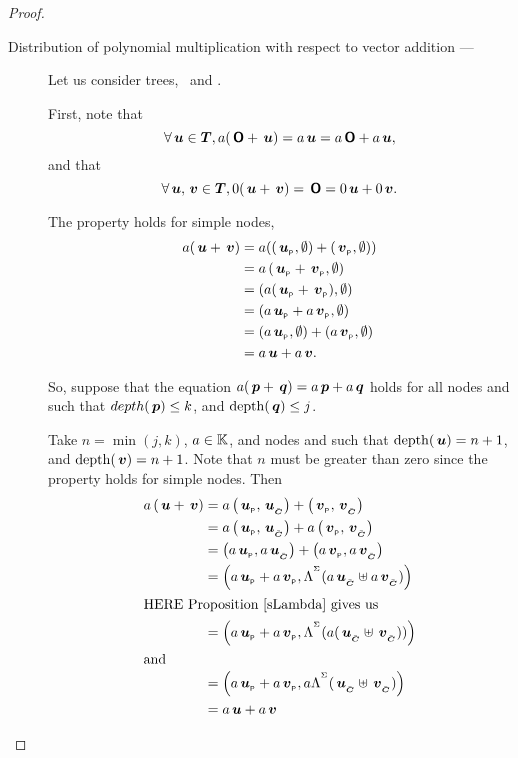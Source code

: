 \begin{proposition}
\begin{proof}
\begin{description}
    \item[Distribution of polynomial multiplication with respect to vector addition --- ]

      Let us consider trees, \ and .

      First, note that \[\forall \node{u} \in \DOM, a(\zerotree + \node{u}) = a \node{u} = a\zerotree + a \node{u},\]
      and that \[\forall \node{u},\node{v}\in\DOM, 0 (\node{u} + \node{v}) = \zerotree = 0 \node{u} + 0 \node{v}.\]

      The property holds for simple nodes, 
      \begin{align*}
        a(\node{u} + \node{v}) &= a (\NodeR{\nlabel{u}}{\emptyset} + \NodeR{\nlabel{v}}{\emptyset})\\ 
        &= a \NodeR{\nlabel{u} + \nlabel{v}}{\emptyset} \\
        &= \NodeR{a(\nlabel{u} + \nlabel{v})}{\emptyset} \\
        &= \NodeR{a\nlabel{u} + a\nlabel{v}}{\emptyset} \\
        &= \NodeR{a\nlabel{u}}{\emptyset} + \NodeR{a\nlabel{v}}{\emptyset} \\
        &= a \node{u} + a \node{v}.
      \end{align*}

      So, suppose that the equation $a ( \node{p} + \node{q}) =
      a \node{p} + a \node{q}$ holds for all nodes  and
       such that $depth(\node{p}) \leq k$, and
      $\depth(\node{q}) \leq j$.

      Take $n = \min(j, k)$, $a\in\FIELD$, and nodes  and  such that
      $\depth(\node{u}) = n+1$, and $\depth(\node{v}) = n+1$.
      Note that $n$ must be greater than zero since the property holds for simple
      nodes.  Then
      \begin{align*}
        a \left(\node{u} + \node{v}\right) &= a \NodeR{\nlabel{u}}{\child{u}} + \NodeR{\nlabel{v}}{\child{v}}\\
        &= a\NodeR{\nlabel{u}}{\child{u}} + a\NodeR{\nlabel{v}}{\child{v}}\\        
        &= \NodeR{a \nlabel{u}}{a \child{u}} + \NodeR{a \nlabel{v}}{a \child{v}}\\
        &= \NodeR{a \nlabel{u} + a \nlabel{v}}{\LS(a \child{u} \mscup a \child{v})}\\
        \intertext{HERE Proposition \ref{sLambda} gives us}
        &= \NodeR{a \nlabel{u} + a \nlabel{v}}{\LS(a(\child{u} \mscup \child{v}))}\\
        \intertext{and }
        &= \NodeR{a \nlabel{u} + a \nlabel{v}}{a \LS(\child{u} \mscup \child{v})}\\
        &= a\node{u} + a\node{v}
      \end{align*}


\end{description}
\end{proof}
\end{proposition}
